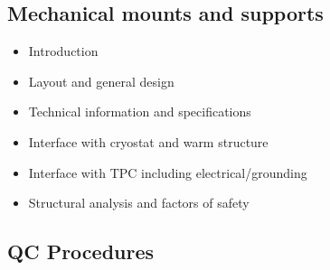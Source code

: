 \subsection{Mechanical mounts and supports}
\begin{itemize}
\item Introduction 
\item Layout and general design
\item Technical information and specifications
\item Interface with cryostat and warm structure
\item Interface with TPC including electrical/grounding 
\item Structural analysis and factors of safety
\end{itemize}

\subsection{QC Procedures}

